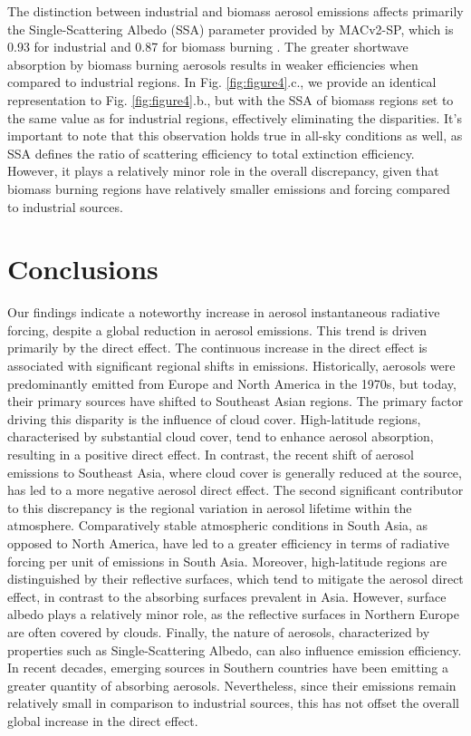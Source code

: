 \documentclass[draft]{agujournal2019}
\begin{document}
            The distinction between industrial and biomass aerosol emissions affects primarily the Single-Scattering Albedo (SSA) parameter provided by MACv2-SP, which is 0.93 for industrial and 0.87 for biomass burning \cite{Stevens_2017}. The greater shortwave absorption by biomass burning aerosols results in weaker efficiencies when compared to industrial regions. In Fig. \ref{fig:figure4}.c., we provide an identical representation to Fig. \ref{fig:figure4}.b., but with the SSA of biomass regions set to the same value as for industrial regions, effectively eliminating the disparities.
            It's important to note that this observation holds true in all-sky conditions as well, as SSA defines the ratio of scattering efficiency to total extinction efficiency. However, it plays a relatively minor role in the overall discrepancy, given that biomass burning regions have relatively smaller emissions and forcing compared to industrial sources.

\section{Conclusions}
      Our findings indicate a noteworthy increase in aerosol instantaneous radiative forcing, despite a global reduction in aerosol emissions. This trend is driven primarily by the direct effect. The continuous increase in the direct effect is associated with significant regional shifts in emissions. Historically, aerosols were predominantly emitted from Europe and North America in the 1970s, but today, their primary sources have shifted to Southeast Asian regions.
      The primary factor driving this disparity is the influence of cloud cover. High-latitude regions, characterised by substantial cloud cover, tend to enhance aerosol absorption, resulting in a positive direct effect. In contrast, the recent shift of aerosol emissions to Southeast Asia, where cloud cover is generally reduced at the source, has led to a more negative aerosol direct effect. 
      The second significant contributor to this discrepancy is the regional variation in aerosol lifetime within the atmosphere. Comparatively stable atmospheric conditions in South Asia, as opposed to North America, have led to a greater efficiency in terms of radiative forcing per unit of emissions in South Asia. 
      Moreover, high-latitude regions are distinguished by their reflective surfaces, which tend to mitigate the aerosol direct effect, in contrast to the absorbing surfaces prevalent in Asia. However, surface albedo plays a relatively minor role, as the reflective surfaces in Northern Europe are often covered by clouds.
      Finally, the nature of aerosols, characterized by properties such as Single-Scattering Albedo, can also influence emission efficiency. In recent decades, emerging sources in Southern countries have been emitting a greater quantity of absorbing aerosols. Nevertheless, since their emissions remain relatively small in comparison to industrial sources, this has not offset the overall global increase in the direct effect.
\end{document}
